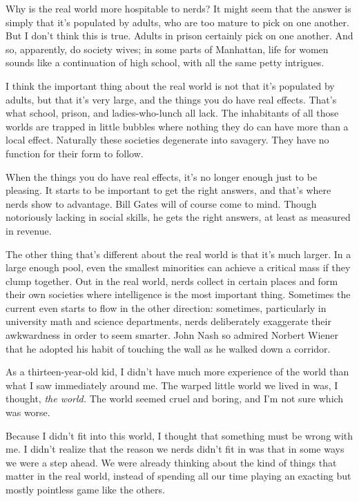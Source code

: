 Why is the real world more hospitable to nerds? It might seem that the
answer is simply that it's populated by adults, who are too mature to
pick on one another. But I don't think this is true. Adults in prison
certainly pick on one another. And so, apparently, do society wives; in
some parts of Manhattan, life for women sounds like a continuation of
high school, with all the same petty intrigues.

I think the important thing about the real world is not that it's
populated by adults, but that it's very large, and the things you do
have real effects. That's what school, prison, and ladies-who-lunch all
lack. The inhabitants of all those worlds are trapped in little bubbles
where nothing they do can have more than a local effect. Naturally these
societies degenerate into savagery. They have no function for their form
to follow.

When the things you do have real effects, it's no longer enough just to
be pleasing. It starts to be important to get the right answers, and
that's where nerds show to advantage. Bill Gates will of course come to
mind. Though notoriously lacking in social skills, he gets the right
answers, at least as measured in revenue.

The other thing that's different about the real world is that it's much
larger. In a large enough pool, even the smallest minorities can achieve
a critical mass if they clump together. Out in the real world, nerds
collect in certain places and form their own societies where
intelligence is the most important thing. Sometimes the current even
starts to flow in the other direction: sometimes, particularly in
university math and science departments, nerds deliberately exaggerate
their awkwardness in order to seem smarter. John Nash so admired Norbert
Wiener that he adopted his habit of touching the wall as he walked down
a corridor.

As a thirteen-year-old kid, I didn't have much more experience of the
world than what I saw immediately around me. The warped little world we
lived in was, I thought, \emph{the world.} The world seemed cruel and
boring, and I'm not sure which was worse.

Because I didn't fit into this world, I thought that something must be
wrong with me. I didn't realize that the reason we nerds didn't fit in
was that in some ways we were a step ahead. We were already thinking
about the kind of things that matter in the real world, instead of
spending all our time playing an exacting but mostly pointless game like
the others.

